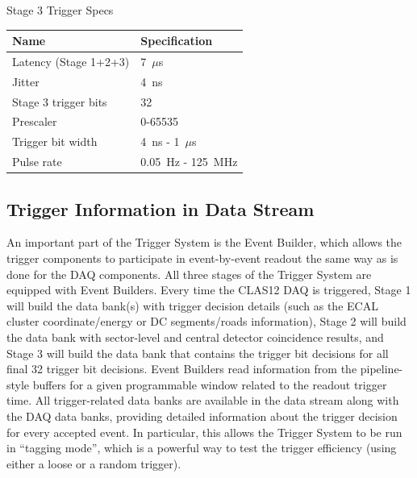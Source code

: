 \begin{center}
	Stage 3 Trigger Specs\\
	\begin{tabular}{| l | l |}
		\hline \hline
		Name				& Specification	\\
		\hline
		Latency (Stage 1+2+3)		& 7~$\mu$s	\\
		Jitter				& 4~ns		\\
		Stage 3 trigger bits		& 32		\\
		Prescaler			& 0-65535	\\
		Trigger bit width		& 4~ns - 1~$\mu$s	\\
		Pulse rate			& 0.05~Hz - 125~MHz	\\
		\hline \hline
	\end{tabular}
\end{center}


\subsection{Trigger Information in Data Stream}
\label{sec:trigger_in_datastream}

An important part of the Trigger System is the Event Builder, which allows the trigger components to participate in event-by-event readout the same way as is done for the DAQ components. All three stages of the Trigger System are equipped with Event Builders. Every time the CLAS12 DAQ is triggered, Stage 1 will build the data bank(s) with trigger decision details (such as the ECAL cluster coordinate/energy or DC segments/roads information), Stage 2 will build the data bank with sector-level and central detector coincidence results, and Stage 3 will build the data bank that contains the trigger bit decisions for all final 32 trigger bit decisions. Event Builders read information from the pipeline-style buffers for a given programmable window related to the readout trigger time. All trigger-related data banks are available in the data stream along with the DAQ data banks, providing detailed information about the trigger decision for every accepted event. In particular, this allows the Trigger System to be run in ``tagging mode'', which is a powerful way to test the trigger efficiency (using either a loose or a random trigger).
